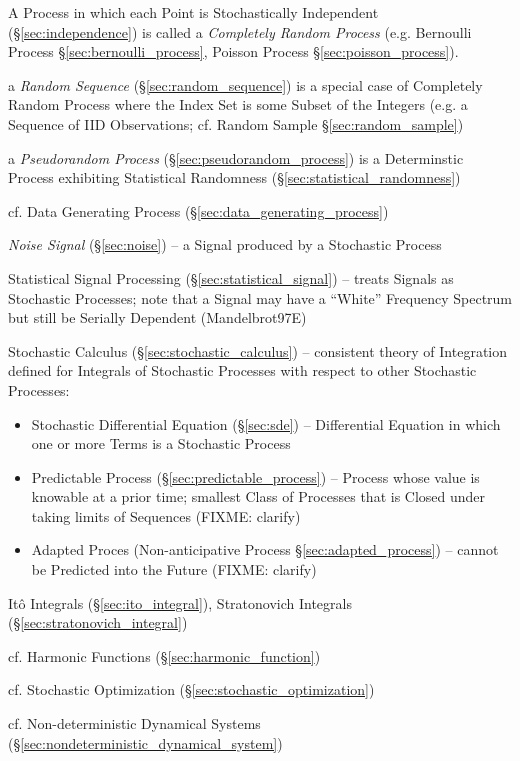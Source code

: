 A Process in which each Point is Stochastically Independent
(\S\ref{sec:independence}) is called a \emph{Completely Random Process} (e.g.
Bernoulli Process \S\ref{sec:bernoulli_process}, Poisson Process
\S\ref{sec:poisson_process}).

\fist a \emph{Random Sequence} (\S\ref{sec:random_sequence}) is a special case
of Completely Random Process where the Index Set is some Subset of the Integers
(e.g. a Sequence of IID Observations; cf. Random Sample
\S\ref{sec:random_sample})

\fist a \emph{Pseudorandom Process} (\S\ref{sec:pseudorandom_process}) is a
Determinstic Process exhibiting Statistical Randomness
(\S\ref{sec:statistical_randomness})

\fist cf. Data Generating Process (\S\ref{sec:data_generating_process})

\fist \emph{Noise Signal} (\S\ref{sec:noise}) -- a Signal produced by a
Stochastic Process

\fist Statistical Signal Processing (\S\ref{sec:statistical_signal}) -- treats
Signals as Stochastic Processes;
note that a Signal may have a ``White'' Frequency Spectrum but still be Serially
Dependent (Mandelbrot97E)

\fist Stochastic Calculus (\S\ref{sec:stochastic_calculus}) -- consistent theory
of Integration defined for Integrals of Stochastic Processes with respect to
other Stochastic Processes:
\begin{itemize}
  \item Stochastic Differential Equation (\S\ref{sec:sde}) -- Differential
    Equation in which one or more Terms is a Stochastic Process
  \item Predictable Process (\S\ref{sec:predictable_process}) -- Process whose
    value is knowable at a prior time; smallest Class of Processes that is
    Closed under taking limits of Sequences (FIXME: clarify)
  \item Adapted Proces (Non-anticipative Process \S\ref{sec:adapted_process}) --
    cannot be Predicted into the Future (FIXME: clarify)
\end{itemize}
It\^o Integrals (\S\ref{sec:ito_integral}), Stratonovich Integrals
(\S\ref{sec:stratonovich_integral})

cf. Harmonic Functions (\S\ref{sec:harmonic_function})

\fist cf. Stochastic Optimization (\S\ref{sec:stochastic_optimization})

\fist cf. Non-deterministic Dynamical Systems
(\S\ref{sec:nondeterministic_dynamical_system})

